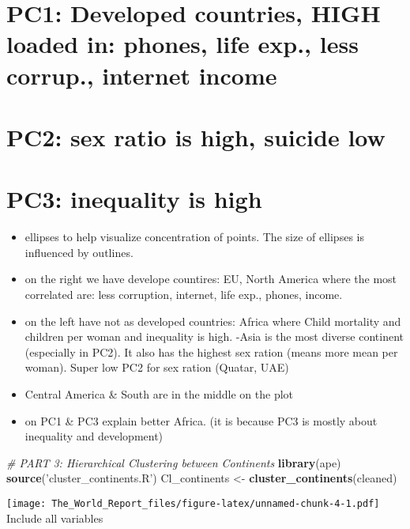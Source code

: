 \documentclass[]{article}
\newenvironment{Shaded}{\begin{snugshade}}{\end{snugshade}}
\newcommand{\KeywordTok}[1]{\textcolor[rgb]{0.13,0.29,0.53}{\textbf{#1}}}
\newcommand{\StringTok}[1]{\textcolor[rgb]{0.31,0.60,0.02}{#1}}
\newcommand{\CommentTok}[1]{\textcolor[rgb]{0.56,0.35,0.01}{\textit{#1}}}
\newcommand{\NormalTok}[1]{#1}
\begin{document}
\section{PC1: Developed countries, HIGH loaded in: phones, life exp.,
less corrup., internet
income}\label{pc1-developed-countries-high-loaded-in-phones-life-exp.-less-corrup.-internet-income}

\section{PC2: sex ratio is high, suicide
low}\label{pc2-sex-ratio-is-high-suicide-low}

\section{PC3: inequality is high}\label{pc3-inequality-is-high}

\begin{itemize}
\item
  ellipses to help visualize concentration of points. The size of
  ellipses is influenced by outlines.
\item
  on the right we have develope countires: EU, North America where the
  most correlated are: less corruption, internet, life exp., phones,
  income.
\item
  on the left have not as developed countries: Africa where Child
  mortality and children per woman and inequality is high. -Asia is the
  most diverse continent (especially in PC2). It also has the highest
  sex ration (means more mean per woman). Super low PC2 for sex ration
  (Quatar, UAE)
\item
  Central America \& South are in the middle on the plot
\item
  on PC1 \& PC3 explain better Africa. (it is because PC3 is mostly
  about inequality and development)
\end{itemize}

\begin{Shaded}
\begin{Highlighting}[]
\CommentTok{# PART 3: Hierarchical Clustering between Continents}
\KeywordTok{library}\NormalTok{(ape)}
\KeywordTok{source}\NormalTok{(}\StringTok{'cluster_continents.R'}\NormalTok{)}
\NormalTok{Cl_continents <-}\StringTok{ }\KeywordTok{cluster_continents}\NormalTok{(cleaned)}
\end{Highlighting}
\end{Shaded}

\texttt{[image: The\_World\_Report\_files/figure-latex/unnamed-chunk-4-1.pdf]}
Include all variables
\end{document}
